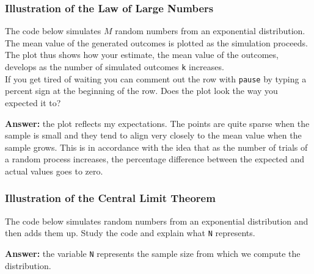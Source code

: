 \documentclass[letterpaper,12pt]{article}
\begin{document}
\subsubsection*{Illustration of the Law of Large Numbers}
The code below simulates $M$ random numbers from an exponential distribution. The mean value of the generated outcomes is plotted as the simulation proceeds. The plot thus shows how your estimate, the mean value of the outcomes, develops as the number of simulated outcomes \texttt{k} increases.\\
If you get tired of waiting you can comment out the row with \texttt{pause} by typing a percent sign at the beginning of the row. Does the plot look the way you expected it to?
\begin{figure}
\centering
\end{figure}
\begin{tcolorbox}
\textbf{Answer:}
the plot reflects my expectations. The points are quite sparse when the sample is small and they tend to align very closely to the mean value when the sample grows. This is in accordance with the idea that as the number of trials of a random process increases, the percentage difference between the expected and actual values goes to zero.
\end{tcolorbox}

\subsubsection*{Illustration of the Central Limit Theorem}
The code below simulates random numbers from an exponential distribution and then adds them up. Study the code and explain what \texttt{N} represents.
\begin{tcolorbox}
\textbf{Answer:}
the variable \texttt{N} represents the sample size from which we compute the distribution. 
\end{tcolorbox}
\end{document}
